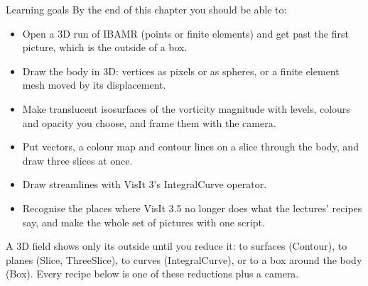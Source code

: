 \documentclass[aspectratio=169,11pt]{beamer}
\begin{document}
\begin{frame}{Learning goals}
\label{fr:goals}
\footnotesize By the end of this chapter you should be able to:
\begin{itemize}
  \item Open a 3D run of IBAMR (points or finite elements) and get past the first picture, which is the outside of a box.
  \item Draw the body in 3D: vertices as pixels or as spheres, or a finite element mesh moved by its displacement.
  \item Make translucent isosurfaces of the vorticity magnitude with levels, colours and opacity you choose, and frame them with the camera.
  \item Put vectors, a colour map and contour lines on a slice through the body, and draw three slices at once.
  \item Draw streamlines with VisIt 3's IntegralCurve operator.
  \item Recognise the places where VisIt 3.5 no longer does what the lectures' recipes say, and make the whole set of pictures with one script.
\end{itemize}
\begin{punchbox}
\small A 3D field shows only its outside until you reduce it: to surfaces (Contour), to planes (Slice, ThreeSlice), to curves (IntegralCurve), or to a box around the body (Box). Every recipe below is one of these reductions plus a camera.
\end{punchbox}
\end{frame}
\end{document}
